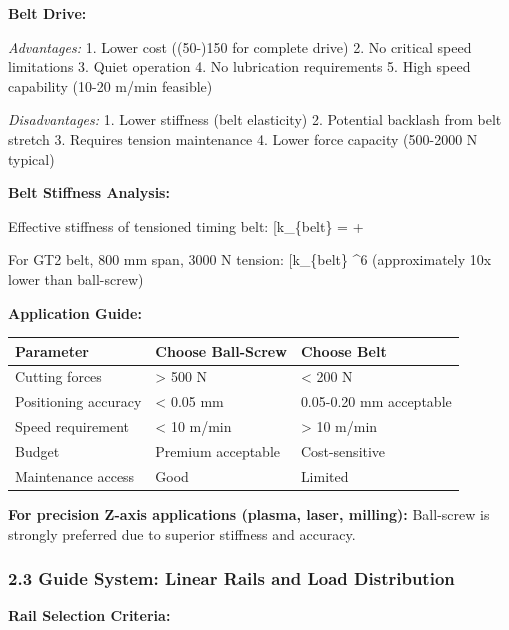 \documentclass[
]{article}
\begin{document}
\textbf{Belt Drive:}

\emph{Advantages:} 1. Lower cost ((50-)150 for complete drive) 2. No
critical speed limitations 3. Quiet operation 4. No lubrication
requirements 5. High speed capability (10-20 m/min feasible)

\emph{Disadvantages:} 1. Lower stiffness (belt elasticity) 2. Potential
backlash from belt stretch 3. Requires tension maintenance 4. Lower
force capacity (500-2000 N typical)

\textbf{Belt Stiffness Analysis:}

Effective stiffness of tensioned timing belt: {[}k\_\{belt\} =
 +
\frac{T_{tension}}{elongation}{]}

For GT2 belt, 800 mm span, 3000 N tension: {[}k\_\{belt\} 
\^{}6 \text{ N/m}{]} (approximately 10x lower than ball-screw)

\textbf{Application Guide:}

{\def\LTcaptype{} %
\begin{longtable}[]{@{}lll@{}}
\toprule\noalign{}
Parameter & Choose Ball-Screw & Choose Belt \\
\midrule\noalign{}
\endhead
\bottomrule\noalign{}
\endlastfoot
Cutting forces & \textgreater{} 500 N & \textless{} 200 N \\
Positioning accuracy & \textless{} 0.05 mm & 0.05-0.20 mm acceptable \\
Speed requirement & \textless{} 10 m/min & \textgreater{} 10 m/min \\
Budget & Premium acceptable & Cost-sensitive \\
Maintenance access & Good & Limited \\
\end{longtable}
}

\textbf{For precision Z-axis applications (plasma, laser, milling):}
Ball-screw is strongly preferred due to superior stiffness and accuracy.

\subsubsection{2.3 Guide System: Linear Rails and Load
Distribution}\label{guide-system-linear-rails-and-load-distribution}

\textbf{Rail Selection Criteria:}
\end{document}

